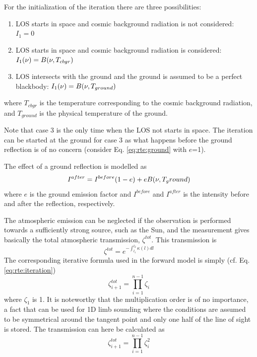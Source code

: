  
 For the initialization of the iteration there are three possibilities:
    
 \begin{enumerate}
      \item LOS starts in space and cosmic background radiation is not
            considered: $I_1=0$
      \item LOS starts in space and cosmic background radiation is 
            considered: $I_1(\nu)=B(\nu,T_{cbgr})$
      \item LOS intersects with the ground and the ground is assumed to 
            be a perfect blackbody: $I_1(\nu)=B(\nu,T_{ground})$
 \end{enumerate}
 where $T_{cbgr}$ is the temperature corresponding to the cosmic
 background radiation, and $T_{ground}$ is the physical temperature of
 the ground.
 
 Note that case 3 is the only time when the LOS not starts in space.  The
 iteration can be started at the ground for case 3 as what happens
 before the ground reflection is of no concern (consider Eq.
 \ref{eq:rte:ground} with $e$=1).


  \label{sec:rte:ground}

 The effect of a ground reflection is modelled as
 \begin{equation}
   I^{after} = I^{before}(1-e) + eB(\nu,T_ground)
  \label{eq:rte:ground}
 \end{equation} 
 where $e$ is the ground emission factor and $I^{before}$ and
 $I^{after}$ is the intensity before and after the reflection,
 respectively. 


 \label{sec:rte:trans}
  
 The atmospheric emission can be neglected if the observation is
 performed towards a sufficiently strong source, such as the Sun, and
 the measurement gives basically the total atmospheric transmission,
 $\zeta^{tot}$. This transmission is
 \begin{equation}
   \zeta^{tot} = e^{-\int_{l_1}^{l_2}{\kappa(l)dl}}
  \label{eq:rte:tottrans}
 \end{equation}
 The corresponding iterative formula used in the forward model is
 simply (cf. Eq. \ref{eq:rte:iteration})
 \begin{equation}
   \zeta_{i+1}^{tot} = \prod_{i=1}^{n-1}\zeta_{i}
 \end{equation} 
 where $\zeta_1$ is 1. It is noteworthy that the multiplication order
 is of no importance, a fact that can be used for 1D limb sounding where
 the conditions are assumed to be symmetrical around the tangent point and
 only one half of the line of sight is stored. The transmission can here be 
 calculated as
 \begin{equation}
   \zeta_{i+1}^{tot} = \prod_{i=1}^{n-1}\zeta_{i}^2
 \end{equation} 

